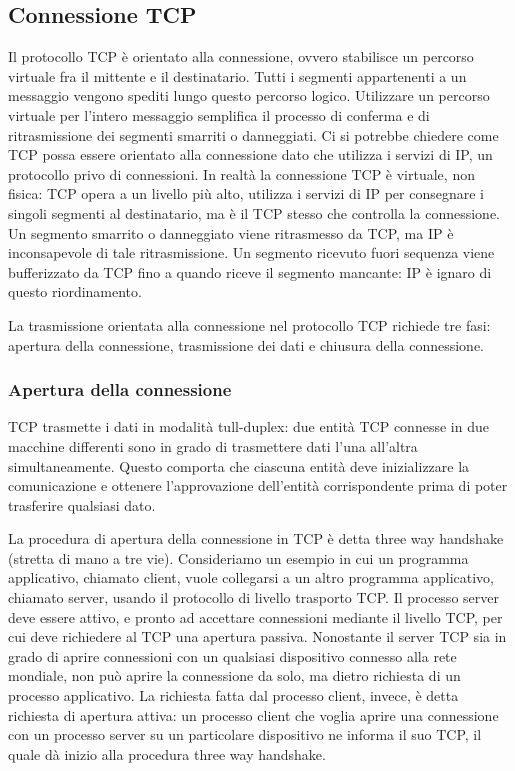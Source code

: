 \subsection{Connessione TCP}
Il protocollo TCP è orientato alla connessione, ovvero stabilisce un percorso virtuale fra il mittente e il destinatario. Tutti i segmenti appartenenti a un messaggio vengono spediti lungo questo percorso logico. Utilizzare un percorso virtuale per l'intero messaggio semplifica il processo di conferma e di ritrasmissione dei segmenti smarriti o danneggiati. Ci si potrebbe chiedere come TCP possa essere orientato alla connessione dato che utilizza i servizi di IP, un protocollo privo di connessioni. In realtà la connessione TCP è virtuale, non fisica: TCP opera a un livello più alto, utilizza i servizi di IP per consegnare i singoli segmenti al destinatario, ma è il TCP stesso che controlla la connessione. Un segmento smarrito o danneggiato viene ritrasmesso da TCP, ma IP è inconsapevole di tale ritrasmissione. Un segmento ricevuto fuori sequenza viene bufferizzato da TCP fino a quando riceve il segmento mancante: IP è ignaro di questo riordinamento.

La trasmissione orientata alla connessione nel protocollo TCP richiede tre fasi: apertura della connessione, trasmissione dei dati e chiusura della connessione.

\subsubsection{Apertura della connessione}
TCP trasmette i dati in modalità tull-duplex: due entità TCP connesse in due macchine differenti sono in grado di trasmettere dati l'una all'altra simultaneamente. Questo comporta che ciascuna entità deve inizializzare la comunicazione e ottenere l'approvazione dell'entità corrispondente prima di poter trasferire qualsiasi dato.

La procedura di apertura della connessione in TCP è detta three way handshake (stretta di mano a tre vie). Consideriamo un esempio in cui un programma applicativo, chiamato client, vuole collegarsi a un altro programma applicativo, chiamato server, usando il protocollo di livello trasporto TCP. Il processo server deve essere attivo, e pronto ad accettare connessioni mediante il livello TCP, per cui deve richiedere al TCP una apertura passiva. Nonostante il server TCP sia in grado di aprire connessioni con un qualsiasi dispositivo connesso alla rete mondiale, non può aprire la connessione da solo, ma dietro richiesta di un processo applicativo. La richiesta fatta dal processo client, invece, è detta richiesta di apertura attiva: un processo client che voglia aprire una connessione con un processo server su un particolare dispositivo ne informa il suo TCP, il quale dà inizio alla procedura three way handshake.

